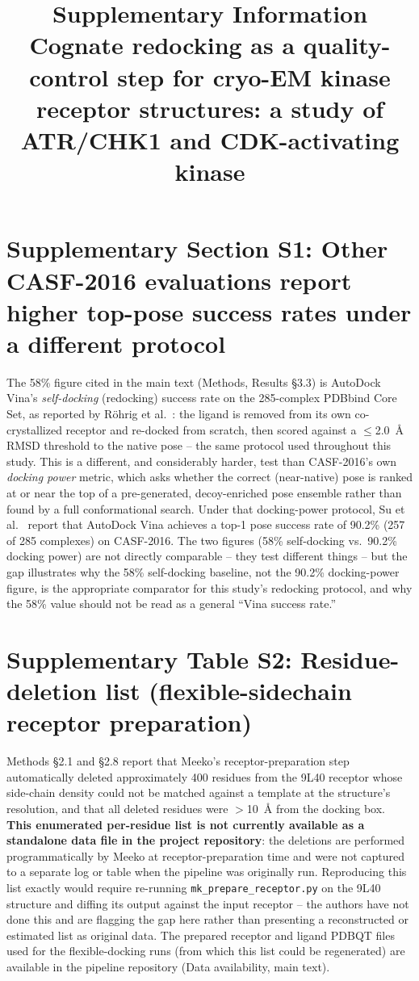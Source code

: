 \documentclass[11pt]{article}
\title{Supplementary Information\\
\large Cognate redocking as a quality-control step for cryo-EM kinase
receptor structures: a study of ATR/CHK1 and CDK-activating kinase}
\author{}
\date{}
\begin{document}
\maketitle

\section*{Supplementary Section S1: Other CASF-2016 evaluations report
higher top-pose success rates under a different protocol}

The 58\% figure cited in the main text (Methods, Results \S3.3) is
AutoDock Vina's \emph{self-docking} (redocking) success rate on the
285-complex PDBbind Core Set, as reported by R\"ohrig et
al.~\cite{zhang2023}: the ligand is removed from its own co-crystallized
receptor and re-docked from scratch, then scored against a $\le$2.0~\AA{}
RMSD threshold to the native pose -- the same protocol used throughout
this study. This is a different, and considerably harder, test than
CASF-2016's own \emph{docking power} metric, which asks whether the
correct (near-native) pose is ranked at or near the top of a
pre-generated, decoy-enriched pose ensemble rather than found by a full
conformational search. Under that docking-power protocol, Su et
al.~\cite{su2019} report that AutoDock Vina achieves a top-1 pose success
rate of 90.2\% (257 of 285 complexes) on CASF-2016. The two figures (58\%
self-docking vs.\ 90.2\% docking power) are not directly comparable --
they test different things -- but the gap illustrates why the 58\%
self-docking baseline, not the 90.2\% docking-power figure, is the
appropriate comparator for this study's redocking protocol, and why the
58\% value should not be read as a general ``Vina success rate.''

\section*{Supplementary Table S2: Residue-deletion list (flexible-sidechain
receptor preparation)}

Methods \S2.1 and \S2.8 report that Meeko's receptor-preparation step
automatically deleted approximately 400 residues from the 9L40 receptor
whose side-chain density could not be matched against a template at the
structure's resolution, and that all deleted residues were $>$10~\AA{}
from the docking box. \textbf{This enumerated per-residue list is not
currently available as a standalone data file in the project
repository}: the deletions are performed programmatically by Meeko at
receptor-preparation time and were not captured to a separate log or
table when the pipeline was originally run. Reproducing this list exactly
would require re-running \texttt{mk\_prepare\_receptor.py} on the 9L40
structure and diffing its output against the input receptor -- the
authors have not done this and are flagging the gap here rather than
presenting a reconstructed or estimated list as original data. The
prepared receptor and ligand PDBQT files used for the flexible-docking
runs (from which this list could be regenerated) are available in the
pipeline repository (Data availability, main text).
\end{document}
